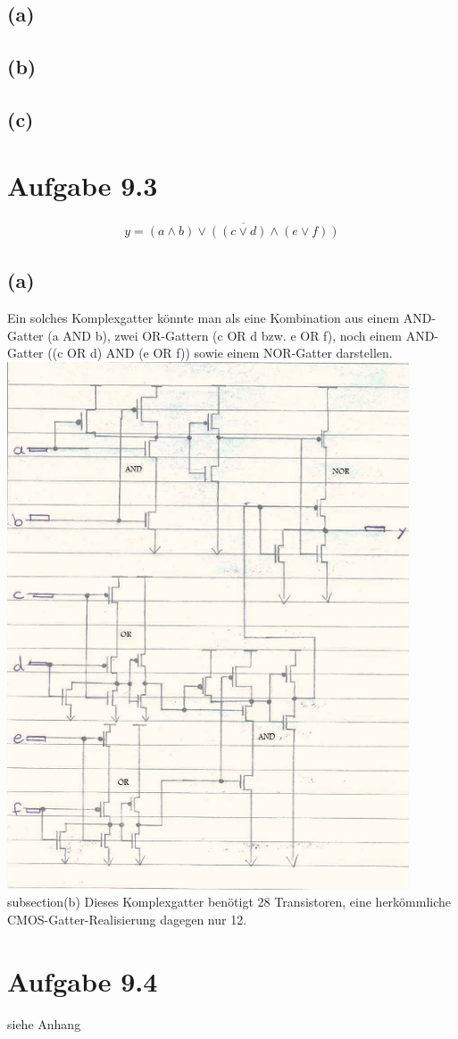 \documentclass[12pt]{article}
\begin{document}
\subsection{(a)}
\subsection{(b)}
\subsection{(c)}

\section{Aufgabe 9.3}
\begin{align}
y = \overline{(a \land b) \lor ((c \lor d) \land (e \lor f))}
\end{align}
\subsection{(a)}
Ein solches Komplexgatter könnte man als eine Kombination aus einem
AND-Gatter (a AND b), zwei OR-Gattern (c OR d bzw. e OR f), noch
einem AND-Gatter ((c OR d) AND (e OR f)) sowie einem NOR-Gatter
darstellen.
\includegraphics{Schaltskizze93a}
subsection{(b)}
Dieses Komplexgatter benötigt 28 Transistoren, eine herkömmliche CMOS-Gatter-Realisierung dagegen nur 12.

\section{Aufgabe 9.4}
siehe Anhang
\end{document}
